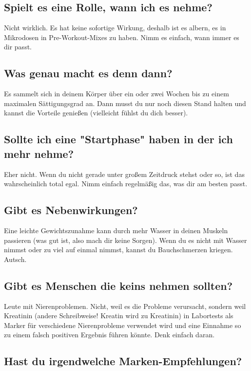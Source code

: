 \documentclass{article}
\begin{document}
\subsection{Spielt es eine Rolle, wann ich es nehme?}

Nicht wirklich. Es hat keine sofortige Wirkung, deshalb ist es albern, es in Mikrodosen in Pre-Workout-Mixes zu haben. Nimm es einfach, wann immer es dir passt.

\subsection{Was genau macht es denn dann?}

Es sammelt sich in deinem Körper über ein oder zwei Wochen bis zu einem maximalen Sättigungsgrad an. Dann musst du nur noch diesen Stand halten und kannst die Vorteile genießen (vielleicht fühlst du dich besser).

\subsection{Sollte ich eine "Startphase" haben in der ich mehr nehme?}

Eher nicht. Wenn du nicht gerade unter großem Zeitdruck stehst oder so, ist das wahrscheinlich total egal. Nimm einfach regelmäßig das, was dir am besten passt.

\subsection{Gibt es Nebenwirkungen?}

Eine leichte Gewichtszunahme kann durch mehr Wasser in deinen Muskeln passieren (was gut ist, also mach dir keine Sorgen). Wenn du es nicht mit Wasser nimmst oder zu viel auf einmal nimmst, kannst du Bauchschmerzen kriegen. Autsch.

\subsection{Gibt es Menschen die keins nehmen sollten?}

Leute mit Nierenproblemen. Nicht, weil es die Probleme verursacht, sondern weil Kreatinin (andere Schreibweise! Kreatin wird zu Kreatinin) in Labortests als Marker für verschiedene Nierenprobleme verwendet wird und eine Einnahme so zu einem falsch positiven Ergebnis führen könnte. Denk einfach daran.

\subsection{Hast du irgendwelche Marken-Empfehlungen?}
\end{document}
